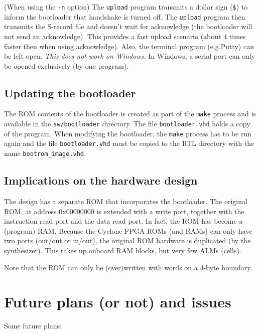 \documentclass[12pt]{article}
\begin{document}
(When using the \lstinline|-n| option) The \lstinline|upload| program transmits a dollar sign (\lstinline|$|) to inform the bootloader that handshake is turned off. The \lstinline|upload| program then transmits the S-record file and doesn't wait for acknowledge (the bootloader will not send an acknowledge). This provides a fast upload scenario (about 4 times faster then when using acknowledge). Also, the terminal program (e.g.\@ Putty) can be left open. \emph{This does not work on Windows.} In Windows, a serial port can only be opened exclusively (by one program).

\subsection{Updating the bootloader}
The ROM contents of the bootloader is created as part of the \lstinline|make| process and is available in the \lstinline|sw/bootloader| directory. The file \lstinline|bootloader.vhd| holds a copy of the program. When modifying the bootloader, the \lstinline|make| process has to be run again and the file \lstinline|bootloader.vhd| must be copied to the RTL directory with the name \lstinline|bootrom_image.vhd|.

\subsection{Implications on the hardware design}
The design has a separate ROM that incorporates the bootloader. The original ROM, at address 0x00000000 is extended with a write port, together with the instruction read port and the data read port. In fact, the ROM has become a (program) RAM. Because the Cyclone FPGA ROMs (and RAMs) can only have two ports (out/out or in/out), the original ROM hardware is duplicated (by the synthesizer). This takes up onboard RAM blocks, but very few ALMs (cells). %

Note that the ROM can only be (over)written with words on a 4-byte boundary.

\section{Future plans (or not) and issues}
Some future plans:
\end{document}

